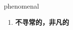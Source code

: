 
\begin{frame}
{\huge phenomenal}
\begin{center}
\begin{enumerate}\Large
  \item \textbf{不寻常的，非凡的}
\end{enumerate}
\end{center}
\end{frame}
